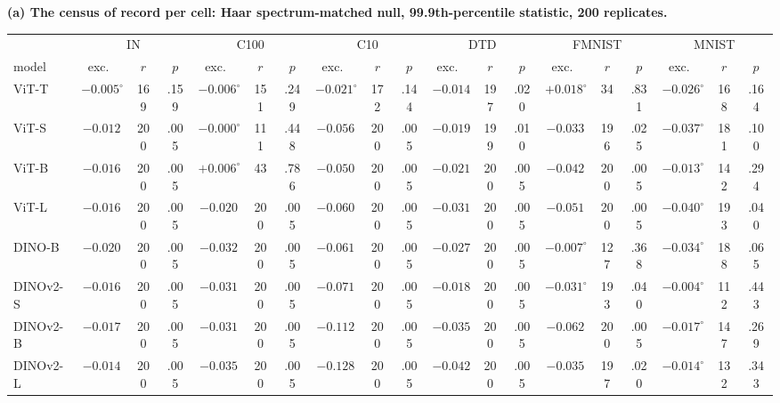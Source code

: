 \begin{table}[tbp]
\centering
\scriptsize
\setlength{\tabcolsep}{1.4pt}
\noindent\textbf{(a) The census of record per cell: Haar spectrum-matched null, 99.9th-percentile statistic, 200 replicates.}\par\vspace{1.5pt}
\begin{tabular}{lcccccccccccccccccc}
\toprule
 & \multicolumn{3}{c}{IN} & \multicolumn{3}{c}{C100} & \multicolumn{3}{c}{C10} & \multicolumn{3}{c}{DTD} & \multicolumn{3}{c}{FMNIST} & \multicolumn{3}{c}{MNIST} \\
model & exc.\ & $r$ & $p$ & exc.\ & $r$ & $p$ & exc.\ & $r$ & $p$ & exc.\ & $r$ & $p$ & exc.\ & $r$ & $p$ & exc.\ & $r$ & $p$ \\
\midrule
ViT-T & $-0.005^{\circ}$ & 169 & .159 & $-0.006^{\circ}$ & 151 & .249 & $-0.021^{\circ}$ & 172 & .144 & $-0.014$ & 197 & .020 & $+0.018^{\circ}$ & 34 & .831 & $-0.026^{\circ}$ & 168 & .164 \\
ViT-S & $-0.012$ & 200 & .005 & $-0.000^{\circ}$ & 111 & .448 & $-0.056$ & 200 & .005 & $-0.019$ & 199 & .010 & $-0.033$ & 196 & .025 & $-0.037^{\circ}$ & 181 & .100 \\
ViT-B & $-0.016$ & 200 & .005 & $+0.006^{\circ}$ & 43 & .786 & $-0.050$ & 200 & .005 & $-0.021$ & 200 & .005 & $-0.042$ & 200 & .005 & $-0.013^{\circ}$ & 142 & .294 \\
ViT-L & $-0.016$ & 200 & .005 & $-0.020$ & 200 & .005 & $-0.060$ & 200 & .005 & $-0.031$ & 200 & .005 & $-0.051$ & 200 & .005 & $-0.040^{\circ}$ & 193 & .040 \\
\midrule
DINO-B & $-0.020$ & 200 & .005 & $-0.032$ & 200 & .005 & $-0.061$ & 200 & .005 & $-0.027$ & 200 & .005 & $-0.007^{\circ}$ & 127 & .368 & $-0.034^{\circ}$ & 188 & .065 \\
DINOv2-S & $-0.016$ & 200 & .005 & $-0.031$ & 200 & .005 & $-0.071$ & 200 & .005 & $-0.018$ & 200 & .005 & $-0.031^{\circ}$ & 193 & .040 & $-0.004^{\circ}$ & 112 & .443 \\
DINOv2-B & $-0.017$ & 200 & .005 & $-0.031$ & 200 & .005 & $-0.112$ & 200 & .005 & $-0.035$ & 200 & .005 & $-0.062$ & 200 & .005 & $-0.017^{\circ}$ & 147 & .269 \\
DINOv2-L & $-0.014$ & 200 & .005 & $-0.035$ & 200 & .005 & $-0.128$ & 200 & .005 & $-0.042$ & 200 & .005 & $-0.035$ & 197 & .020 & $-0.014^{\circ}$ & 132 & .343 \\

\end{tabular}
\end{table}
